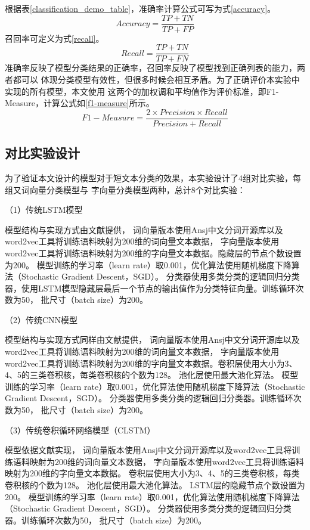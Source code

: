 根据表\ref{classification_demo_table}，准确率计算公式可写为式\ref{accuracy}。
\begin{equation}
    Accuracy=\frac{TP+TN}{TP+FP}
    \label{accuracy}
\end{equation}
召回率可定义为式\ref{recall}。
\begin{equation}
    Recall=\frac{TP+TN}{TP+FN}
    \label{recall}
\end{equation}
准确率反映了模型分类结果的正确率，召回率反映了模型找到正确列表的能力，两者都可以
体现分类模型有效性，但很多时候会相互矛盾。为了正确评价本实验中实现的所有模型，本文使用
这两个的加权调和平均值作为评价标准，即F1-Measure，计算公式如\ref{f1-measure}所示。
\begin{equation}
    F1-Measure=\frac{2\times Precision \times Recall}{Precision+Recall}
    \label{f1-measure}
\end{equation}
\subsection{对比实验设计}
为了验证本文设计的模型对于短文本分类的效果，本实验设计了4组对比实验，每组又词向量分类模型与
字向量分类模型两种，总计8个对比实验：

（1）传统LSTM模型

模型结构与实现方式由文献\cite{zhou2016compositional}提供，
词向量版本使用Ansj中文分词开源库以及word2vec工具将训练语料映射为200维的词向量文本数据，
字向量版本使用word2vec工具将训练语料映射为200维的字向量文本数据。隐藏层的节点个数设置为200。
模型训练的学习率（learn rate）取0.001，优化算法使用随机梯度下降算法（Stochastic Gradient Descent，SGD）。
分类器使用多类分类的逻辑回归分类器，使用LSTM模型隐藏层最后一个节点的输出值作为分类特征向量。训练循环次数为50，
批尺寸（batch size）为200。

（2）传统CNN模型

模型结构与实现方式同样由文献\cite{zhou2016compositional}提供，
词向量版本使用Ansj中文分词开源库以及word2vec工具将训练语料映射为200维的词向量文本数据，
字向量版本使用word2vec工具将训练语料映射为200维的字向量文本数据。卷积层使用大小为3、4、5的三类卷积核，每类卷积核的个数为128。
池化层使用最大池化算法。
模型训练的学习率（learn rate）取0.001，优化算法使用随机梯度下降算法（Stochastic Gradient Descent，SGD）。
分类器使用多类分类的逻辑回归分类器。训练循环次数为50，
批尺寸（batch size）为200。

（3）传统卷积循环网络模型（CLSTM）

模型依据文献\cite{Zhou2015A}实现，
词向量版本使用Ansj中文分词开源库以及word2vec工具将训练语料映射为200维的词向量文本数据，
字向量版本使用word2vec工具将训练语料映射为200维的字向量文本数据。
卷积层使用大小为3、4、5的三类卷积核，每类卷积核的个数为128。
池化层使用最大池化算法。
LSTM层的隐藏节点个数设置为200。
模型训练的学习率（learn rate）取0.001，优化算法使用随机梯度下降算法（Stochastic Gradient Descent，SGD）。
分类器使用多类分类的逻辑回归分类器。训练循环次数为50，
批尺寸（batch size）为200。

